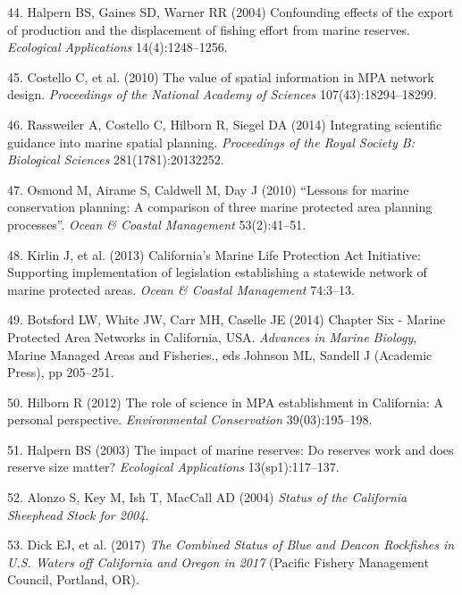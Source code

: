 \documentclass[9pt,twocolumn,twoside,lineno]{pnas-new}
\begin{document}
\leavevmode\hypertarget{ref-halpern2004}{}%
44. Halpern BS, Gaines SD, Warner RR (2004) Confounding effects of the
export of production and the displacement of fishing effort from marine
reserves. \emph{Ecological Applications} 14(4):1248--1256.

\leavevmode\hypertarget{ref-costello2010d}{}%
45. Costello C, et al. (2010) The value of spatial information in MPA
network design. \emph{Proceedings of the National Academy of Sciences}
107(43):18294--18299.

\leavevmode\hypertarget{ref-rassweiler2014}{}%
46. Rassweiler A, Costello C, Hilborn R, Siegel DA (2014) Integrating
scientific guidance into marine spatial planning. \emph{Proceedings of
the Royal Society B: Biological Sciences} 281(1781):20132252.

\leavevmode\hypertarget{ref-osmond2010}{}%
47. Osmond M, Airame S, Caldwell M, Day J (2010) ``Lessons for marine
conservation planning: A comparison of three marine protected area
planning processes''. \emph{Ocean \& Coastal Management} 53(2):41--51.

\leavevmode\hypertarget{ref-kirlin2013}{}%
48. Kirlin J, et al. (2013) California's Marine Life Protection Act
Initiative: Supporting implementation of legislation establishing a
statewide network of marine protected areas. \emph{Ocean \& Coastal
Management} 74:3--13.

\leavevmode\hypertarget{ref-botsford2014}{}%
49. Botsford LW, White JW, Carr MH, Caselle JE (2014) Chapter Six -
Marine Protected Area Networks in California, USA. \emph{Advances in
Marine Biology}, Marine Managed Areas and Fisheries., eds Johnson ML,
Sandell J (Academic Press), pp 205--251.

\leavevmode\hypertarget{ref-hilborn2012}{}%
50. Hilborn R (2012) The role of science in MPA establishment in
California: A personal perspective. \emph{Environmental Conservation}
39(03):195--198.

\leavevmode\hypertarget{ref-halpern2003a}{}%
51. Halpern BS (2003) The impact of marine reserves: Do reserves work
and does reserve size matter? \emph{Ecological Applications}
13(sp1):117--137.

\leavevmode\hypertarget{ref-alonzo2004}{}%
52. Alonzo S, Key M, Ish T, MacCall AD (2004) \emph{Status of the
California Sheephead Stock for 2004}.

\leavevmode\hypertarget{ref-dick2017}{}%
53. Dick EJ, et al. (2017) \emph{The Combined Status of Blue and Deacon
Rockfishes in U.S. Waters off California and Oregon in 2017} (Pacific
Fishery Management Council, Portland, OR).
\end{document}

